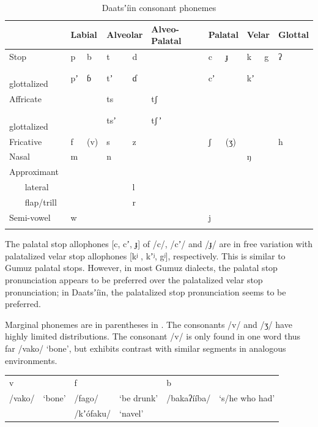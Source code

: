 \documentclass[output=paper]{langsci/langscibook}
\begin{document}
\begin{table}
\begin{tabularx}{\textwidth}{lXXXXXXXXXXXX} \lsptoprule & \multicolumn{2}{X}{Labial} & \multicolumn{2}{X}{Alveolar} & \multicolumn{2}{X}{Alveo-Palatal} & \multicolumn{2}{X}{Palatal} & \multicolumn{2}{X}{Velar} & \multicolumn{2}{X}{Glottal} \\
\midrule
Stop & p   &     b & t    &      d &  &  & c     &    ɟ & k    &    g & ʔ& \\
{\ \ \ } glottalized & pʼ    &   ɓ & tʼ     &    ɗ & &  & cʼ & & kʼ & & & \\
Affricate & & & ts & & tʃ & & &  &  & & & \\
{\ \ \ } glottalized & & & tsʼ & & tʃ\,ʼ & & & & & & & \\
Fricative & f    &    (v) & s     &     z &  & & ʃ    &     (ʒ) & &  & h & \\
Nasal & m & & n & & &  & &  & ŋ & & & \\
Approximant & & & & & & & & & & & & \\
{\ \ \ } lateral & &  & & l & &  & &  & &  & & \\
{\ \ \ } flap/trill & &  & & r & & & & & & & & \\
Semi-vowel & w & & &  &  & & j & & &  & & \\
\lspbottomrule
\end{tabularx}
\caption{Daatsʼíin consonant phonemes}
\label{tab:ahlandc:1}
\end{table}

The palatal stop allophones [c, cʼ, ɟ] of /c/, /cʼ/ and /ɟ/ are in free variation with palatalized velar stop allophones [kʲ , kʼʲ, gʲ], respectively. This is similar to Gumuz palatal stops. However, in most Gumuz dialects, the palatal stop pronunciation appears to be preferred over the palatalized velar stop pronunciation; in Daatsʼíin, the palatalized stop pronunciation seems to be preferred. 

Marginal phonemes are in parentheses in . The consonants /v/ and /ʒ/ have highly limited distributions. The consonant /v/ is only found in one word thus far /vako/ ‘bone’, but exhibits contrast with similar segments in analogous environments. 

\ea
\begin{tabular}{llllll}
v & & f & & b & \\
/vako/   &  ‘bone’  &   /fago/  &   ‘be drunk’  & /bakaʔííba/ & ‘s/he who had’  \\           
& & /kʼ\'{o}faku/ &  ‘navel’ & & \\
\end{tabular}
\z
\end{document}
